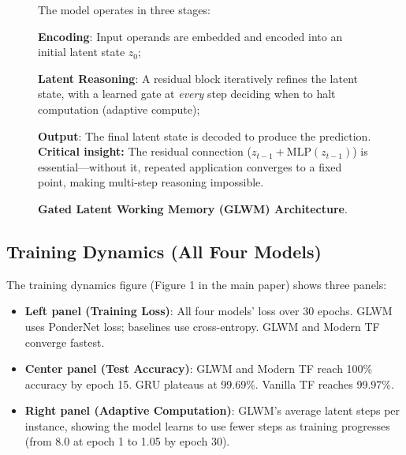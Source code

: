 \documentclass[11pt]{article}
\begin{document}
\begin{figure}[H]
\caption{\textbf{Gated Latent Working Memory (GLWM) Architecture}.}
 The model operates in three stages: 
\item \textbf{Encoding}: Input operands are embedded and encoded into an initial latent state $z_0$; 
\item  \textbf{Latent Reasoning}: A residual block iteratively refines the latent state, with a learned gate 
at \textit{every} step deciding when to halt computation (adaptive compute); 
\item \textbf{Output}: The final latent state is decoded to produce the prediction. 
\textcolor{red!70!black}{\textbf{Critical insight:}} The residual connection ($z_{t-1} + \text{MLP}(z_{t-1})$) is essential—without it, 
repeated application converges to a fixed point, making multi-step reasoning impossible.
\label{fig:glwm_arch}
\end{figure}

\subsection{Training Dynamics (All Four Models)}

The training dynamics figure (Figure 1 in the main paper) shows three panels:
\begin{itemize}
    \item \textbf{Left panel (Training Loss)}: All four models' loss over 30 epochs. GLWM uses PonderNet loss; baselines use cross-entropy. GLWM and Modern TF converge fastest.
    \item \textbf{Center panel (Test Accuracy)}: GLWM and Modern TF reach 100\% accuracy by epoch 15. GRU plateaus at 99.69\%. Vanilla TF reaches 99.97\%.
    \item \textbf{Right panel (Adaptive Computation)}: GLWM's average latent steps per instance, showing the model learns to use fewer steps as training progresses (from 8.0 at epoch 1 to 1.05 by epoch 30).
\end{itemize}
\end{document}
